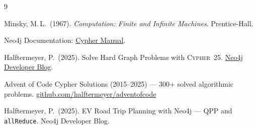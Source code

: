 \documentclass[11pt,a4paper]{article}
\begin{document}
\newpage
\begin{thebibliography}{9}

Minsky, M.\,L.\ (1967).
\emph{Computation: Finite and Infinite Machines}.
Prentice-Hall.

Neo4j Documentation:
\href{https://neo4j.com/docs/cypher-manual/current/}{Cypher Manual}.

Halftermeyer, P.\ (2025).
Solve Hard Graph Problems with \textsc{Cypher~25}.
\href{https://neo4j.com/blog/developer/solve-hard-graph-problems-with-cypher-25/}{Neo4j Developer Blog}.

Advent of Code Cypher Solutions (2015--2025) ---
300+ solved algorithmic problems.
\href{https://github.com/halftermeyer/adventofcode}{github.com/halftermeyer/adventofcode}

Halftermeyer, P.\ (2025).
EV Road Trip Planning with Neo4j --- QPP and \texttt{allReduce}.
Neo4j Developer Blog.

\end{thebibliography}
\end{document}
